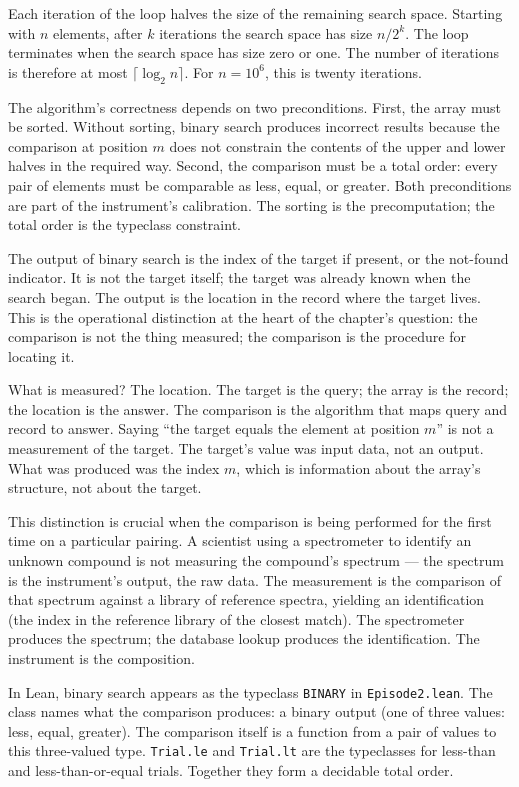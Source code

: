 Each iteration of the loop halves the size of the remaining search space.
Starting with $n$ elements, after $k$ iterations the search space has size
$n / 2^k$. The loop terminates when the search space has size zero or
one. The number of iterations is therefore at most $\lceil \log_2 n
\rceil$. For $n = 10^6$, this is twenty iterations.

The algorithm's correctness depends on two preconditions. First, the array
must be sorted. Without sorting, binary search produces incorrect results
because the comparison at position $m$ does not constrain the contents of
the upper and lower halves in the required way. Second, the comparison
must be a total order: every pair of elements must be comparable as less,
equal, or greater. Both preconditions are part of the instrument's
calibration. The sorting is the precomputation; the total order is the
typeclass constraint.

The output of binary search is the index of the target if present, or the
not-found indicator. It is not the target itself; the target was already
known when the search began. The output is the location in the record
where the target lives. This is the operational distinction at the heart
of the chapter's question: the comparison is not the thing measured; the
comparison is the procedure for locating it.

What is measured? The location. The target is the query; the array is the
record; the location is the answer. The comparison is the algorithm that
maps query and record to answer. Saying ``the target equals the element at
position $m$'' is not a measurement of the target. The target's value was
input data, not an output. What was produced was the index $m$, which is
information about the array's structure, not about the target.

This distinction is crucial when the comparison is being performed for the
first time on a particular pairing. A scientist using a spectrometer to
identify an unknown compound is not measuring the compound's spectrum --- the
spectrum is the instrument's output, the raw data. The measurement is the
comparison of that spectrum against a library of reference spectra,
yielding an identification (the index in the reference library of the
closest match). The spectrometer produces the spectrum; the database
lookup produces the identification. The instrument is the composition.

In Lean, binary search appears as the typeclass \texttt{BINARY} in
\texttt{Episode2.lean}. The class names what the comparison produces: a
binary output (one of three values: less, equal, greater). The comparison
itself is a function from a pair of values to this three-valued type.
\texttt{Trial.le} and \texttt{Trial.lt} are the typeclasses for less-than
and less-than-or-equal trials. Together they form a decidable total order.

